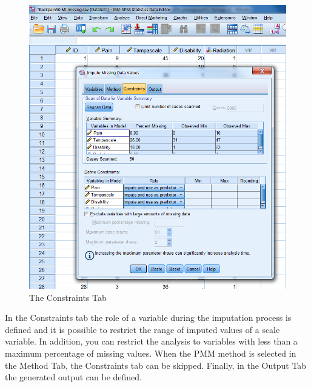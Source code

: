 \documentclass[]{book}
\begin{document}
\begin{figure}

{\centering \includegraphics[width=0.9\linewidth]{images/fig4.8} 

}

\caption{The Constraints Tab}\label{fig:fig4-8}
\end{figure}

In the Constraints tab the role of a variable during the imputation
process is defined and it is possible to restrict the range of imputed
values of a scale variable. In addition, you can restrict the analysis
to variables with less than a maximum percentage of missing values. When
the PMM method is selected in the Method Tab, the Constraints tab can be
skipped. Finally, in the Output Tab the generated output can be defined.
\end{document}
